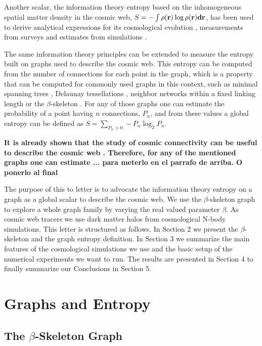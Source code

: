 \documentclass[fleqn,usenatbib]{mnras}
\begin{document}
Another scalar, the information theory entropy based on the inhomogeneous 
spatial matter density in the cosmic web,
$S=-\int\rho(\bf{r})\log\rho(\bf{r}) d\bf{r}$, has
been used to derive analytical expressions for its cosmological evolution
\citep{2004PhRvL..92n1302H}, measurements from surveys
\citep{2015MNRAS.454.2647P}
and estimates from simulations \citep{2020MNRAS.491.5447V}.

The same information theory principles can be extended to measure the entropy built 
on graphs  used to describe the cosmic web. 
This entropy can be computed from the number of connections for each
point in the graph,  which is a property that  can be computed for commonly used graphs in
this context, such as  minimal spanning trees
\citep{1985MNRAS.216...17B}, Delaunay tessellations 
\citep{2007MNRAS.382....2R}, neighbor networks within a fixed linking
length \citep{2016MNRAS.459.2690H} or the $\beta$-skeleton
\citep{2019MNRAS.485.5276F}.   
For any of those graphs one can estimate the probability of a point
having $n$ connections, $P_n$, and from these values a global entropy
can be defined as $S = \sum_{P_n>0}-P_n\log_2{P_n}$. 


\textbf{It is already shown that the study of cosmic connectivity can
  be useful to describe the cosmic web \citep{10.1093/mnras/stz3535}.
  Therefore, for any of the mentioned graphs one can estimate ... para
  meterlo en el parrafo de arriba. O ponerlo al final} 

The purpose of this to letter is to advocate the information theory entropy on a graph
as a global scalar to describe the cosmic web.
We use the $\beta$-skeleton graph to explore a whole graph family 
by varying the real valued parameter $\beta$.
As cosmic web tracers we use dark matter halos from cosmological N-body simulations. 
This letter is structured as follows. 
In Section 2 we present the $\beta$-skeleton and the graph entropy definition.
In Section 3 we summarize the main features of the cosmological simulations we use and 
the basic setup of the numerical experiments we want to run.
The results are presented in Section 4 to finally summarize our Conclusions in Section 5.

\section{Graphs and Entropy}

\subsection{The $\beta$-Skeleton Graph}
\end{document}

